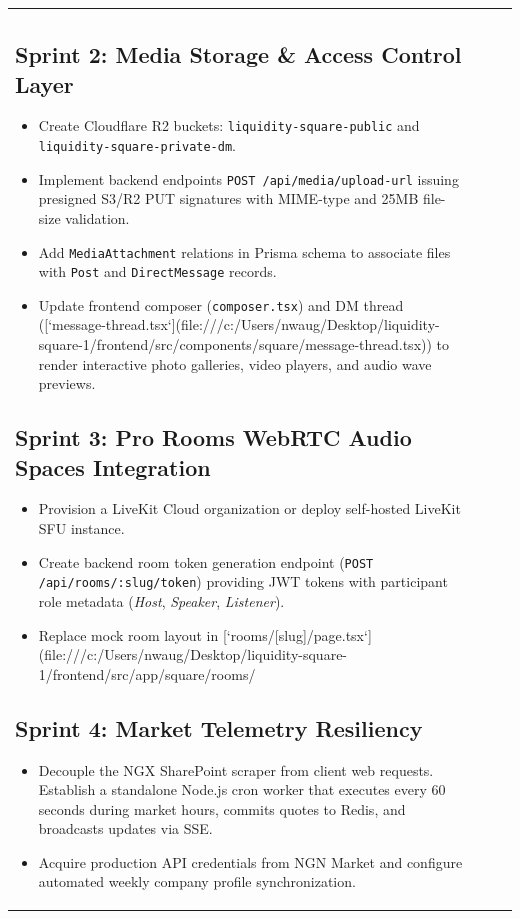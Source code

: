 \documentclass[11pt,a4paper]{article}
\begin{document}
\begin{longtable}{p{4.2cm} p{5.5cm} r r}
\subsection{Sprint 2: Media Storage \& Access Control Layer}
\begin{itemize}
    \item Create Cloudflare R2 buckets: \texttt{liquidity-square-public} and \texttt{liquidity-square-private-dm}.
    \item Implement backend endpoints \texttt{POST /api/media/upload-url} issuing presigned S3/R2 PUT signatures with MIME-type and 25MB file-size validation.
    \item Add \texttt{MediaAttachment} relations in Prisma schema to associate files with \texttt{Post} and \texttt{DirectMessage} records.
    \item Update frontend composer (\texttt{composer.tsx}) and DM thread ([`message-thread.tsx`](file:///c:/Users/nwaug/Desktop/liquidity-square-1/frontend/src/components/square/message-thread.tsx)) to render interactive photo galleries, video players, and audio wave previews.
\end{itemize}

\subsection{Sprint 3: Pro Rooms WebRTC Audio Spaces Integration}
\begin{itemize}
    \item Provision a LiveKit Cloud organization or deploy self-hosted LiveKit SFU instance.
    \item Create backend room token generation endpoint (\texttt{POST /api/rooms/:slug/token}) providing JWT tokens with participant role metadata (\textit{Host}, \textit{Speaker}, \textit{Listener}).
    \item Replace mock room layout in [`rooms/[slug]/page.tsx`](file:///c:/Users/nwaug/Desktop/liquidity-square-1/frontend/src/app/square/rooms/%
\end{itemize}

\subsection{Sprint 4: Market Telemetry Resiliency}
\begin{itemize}
    \item Decouple the NGX SharePoint scraper from client web requests. Establish a standalone Node.js cron worker that executes every 60 seconds during market hours, commits quotes to Redis, and broadcasts updates via SSE.
    \item Acquire production API credentials from NGN Market and configure automated weekly company profile synchronization.
\end{itemize}


\end{longtable}
\end{document}

